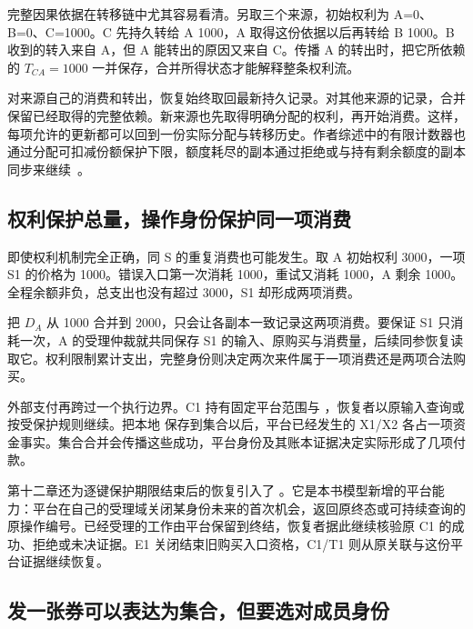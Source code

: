 完整因果依据在转移链中尤其容易看清。另取三个来源，初始权利为 A=0、B=0、C=1000。C 先持久转给 A 1000，A 取得这份依据以后再转给 B 1000。B 收到的转入来自 A，但 A 能转出的原因又来自 C。传播 A 的转出时，把它所依赖的 $T_{CA}=1000$ 一并保存，合并所得状态才能解释整条权利流。


对来源自己的消费和转出，恢复始终取回最新持久记录。对其他来源的记录，合并保留已经取得的完整依赖。新来源也先取得明确分配的权利，再开始消费。这样，每项允许的更新都可以回到一份实际分配与转移历史。作者综述中的有限计数器也通过分配可扣减份额保护下限，额度耗尽的副本通过拒绝或与持有剩余额度的副本同步来继续~\cite{preguica2018crdt}。

\subsection*{权利保护总量，操作身份保护同一项消费}

即使权利机制完全正确，同 S 的重复消费也可能发生。取 A 初始权利 3000，一项 S1 的价格为 1000。错误入口第一次消耗 1000，重试又消耗 1000，A 剩余 1000。全程余额非负，总支出也没有超过 3000，S1 却形成两项消费。

把 $D_A$ 从 1000 合并到 2000，只会让各副本一致记录这两项消费。要保证 S1 只消耗一次，A 的受理仲裁就共同保存 S1 的输入、原购买与消费量，后续同参恢复读取它。权利限制累计支出，完整身份则决定两次来件属于一项消费还是两项合法购买。


外部支付再跨过一个执行边界。C1 持有固定平台范围与 ，恢复者以原输入查询或按受保护规则继续。把本地  保存到集合以后，平台已经发生的 X1/X2 各占一项资金事实。集合合并会传播这些成功，平台身份及其账本证据决定实际形成了几项付款。

第十二章还为逐键保护期限结束后的恢复引入了 。它是本书模型新增的平台能力：平台在自己的受理域关闭某身份未来的首次机会，返回原终态或可持续查询的原操作编号。已经受理的工作由平台保留到终结，恢复者据此继续核验原 C1 的成功、拒绝或未决证据。E1 关闭结束旧购买入口资格，C1/T1 则从原关联与这份平台证据继续恢复。

\subsection*{发一张券可以表达为集合，但要选对成员身份}

